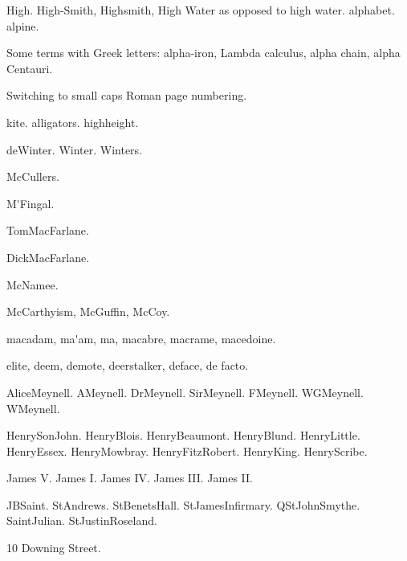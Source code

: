 \documentclass{article}
\newcommand*{\myscroman}[1]{%
  \myscromannum{\value{#1}}%
}
\newcommand*{\myscromannum}[1]{%
  \textsc{\romannumeral#1}%
}
\begin{document}
\gls{High}. \gls{High-Smith}, \gls{Highsmith}, \gls{High Water}
as opposed to \gls{high water}. \Gls{alphabet}. \Gls{alpine}.

Some terms with Greek letters: \gls{alpha-iron}, 
\gls{Lambda calculus}, \gls{alpha chain}, \gls{alpha Centauri}.

\newpage

\renewcommand{\thepage}{\myscroman{page}}%
Switching to small caps Roman page numbering.

\Gls{kite}. \Glspl{alligator}. \Gls{highheight}.

\gls{deWinter}.
\gls{Winter}.
\gls{Winters}.

\gls{McCullers}.

\gls{M'Fingal}.

\gls{TomMacFarlane}.

\gls{DickMacFarlane}.

\gls{McNamee}.

\gls{McCarthyism},
\gls{McGuffin},
\gls{McCoy}.

\Gls{macadam},
\gls{ma'am},
\gls{ma},
\gls{macabre},
\gls{macrame},
\gls{macedoine}.

\Gls{elite},
\gls{deem},
\gls{demote},
\gls{deerstalker},
\gls{deface},
\gls{de facto}.


\gls{AliceMeynell}.
\gls{AMeynell}.
\gls{DrMeynell}.
\gls{SirMeynell}.
\gls{FMeynell}.
\gls{WGMeynell}.
\gls{WMeynell}.

\gls{HenrySonJohn}. \gls{HenryBlois}.
\gls{HenryBeaumont}. \gls{HenryBlund}.
\gls{HenryLittle}. \gls{HenryEssex}. \gls{HenryMowbray}.
\gls{HenryFitzRobert}.
\gls{HenryKing}. \gls{HenryScribe}.

\gls{James V}.
\gls{James I}.
\gls{James IV}.
\gls{James III}.
\gls{James II}.

\gls{JBSaint}.
\gls{StAndrews}.
\gls{StBenetsHall}.
\gls{StJamesInfirmary}.
\gls{QStJohnSmythe}.
\gls{SaintJulian}.
\gls{StJustinRoseland}.

\gls{10 Downing Street}.

\newpage


\printterms
 [
   heading={\section[Word Sorted Index]},%
   database=index,%
   prelocation=dotfill,%
   columns=3,%
   style=index,%
   postheading={Locations in bold indicate primary reference.
   (Word sort.)}
 ]
\end{document}
